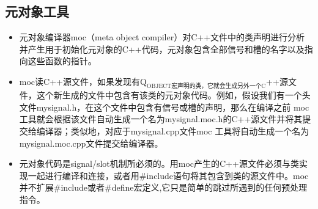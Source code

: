 \documentclass[9pt,b5paper]{article}
\begin{document}
\subsection{元对象工具}
\label{sec-1-5}
\begin{itemize}
\item 元对象编译器moc（meta object compiler）对C++文件中的类声明进行分析并产生用于初始化元对象的C++代码，元对象包含全部信号和槽的名字以及指向这些函数的指针。
\item moc读C++源文件，如果发现有Q$_{\text{OBJECT宏声明的类，它就会生成另外一个C}}$++源文件，这个新生成的文件中包含有该类的元对象代码。例如，假设我们有一个头文件mysignal.h，在这个文件中包含有信号或槽的声明，那么在编译之前 moc 工具就会根据该文件自动生成一个名为mysignal.moc.h的C++源文件并将其提交给编译器；类似地，对应于mysignal.cpp文件moc 工具将自动生成一个名为mysignal.moc.cpp文件提交给编译器。
\item 元对象代码是signal/slot机制所必须的。用moc产生的C++源文件必须与类实现一起进行编译和连接，或者用\#include语句将其包含到类的源文件中。moc并不扩展\#include或者\#define宏定义,它只是简单的跳过所遇到的任何预处理指令。
\end{itemize}
\end{document}
